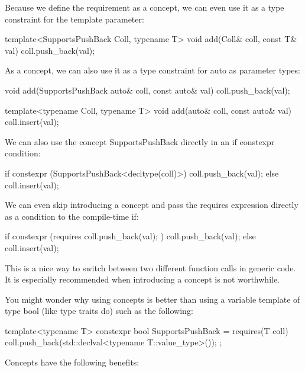 Because we define the requirement as a concept, we can even use it as a type constraint for the template parameter:

\begin{cpp}
template<SupportsPushBack Coll, typename T>
void add(Coll& coll, const T& val)
{
	coll.push_back(val);
}
\end{cpp}

As a concept, we can also use it as a type constraint for auto as parameter types:

\begin{cpp}
void add(SupportsPushBack auto& coll, const auto& val)
{
	coll.push_back(val);
}

template<typename Coll, typename T>
void add(auto& coll, const auto& val)
{
	coll.insert(val);
}
\end{cpp}


We can also use the concept SupportsPushBack directly in an if constexpr condition:

\begin{cpp}
if constexpr (SupportsPushBack<decltype(coll)>) {
	coll.push_back(val);
}
else {
	coll.insert(val);
}
\end{cpp}


We can even skip introducing a concept and pass the requires expression directly as a condition to the compile-time if:

\begin{cpp}
if constexpr (requires { coll.push_back(val); }) {
	coll.push_back(val);
}
else {
	coll.insert(val);
}
\end{cpp}

This is a nice way to switch between two different function calls in generic code. It is especially recommended when introducing a concept is not worthwhile.


You might wonder why using concepts is better than using a variable template of type bool (like type traits do) such as the following:

\begin{cpp}
template<typename T>
constexpr bool SupportsPushBack = requires(T coll) {
	coll.push_back(std::declval<typename T::value_type>());
};
\end{cpp}

Concepts have the following benefits:

